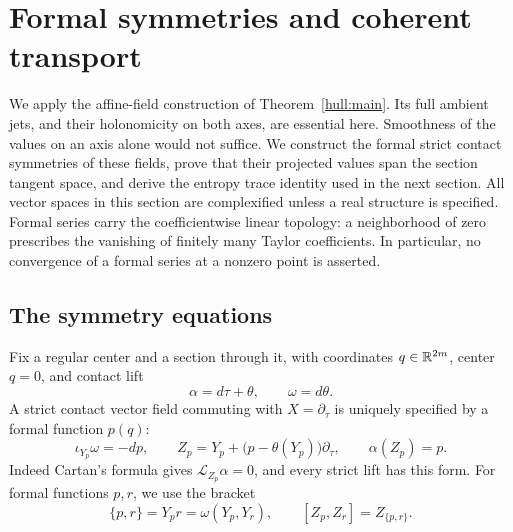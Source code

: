 \section{Formal symmetries and coherent transport}
\label{sym:section}

We apply the affine-field construction of Theorem~\ref{hull:main}.
Its full ambient jets, and their holonomicity on both axes, are essential
here.  Smoothness of the values on an axis alone would not suffice.
We construct the formal strict contact symmetries of these fields,
prove that their projected values span the section tangent space,
and derive the entropy trace identity used in the next section.
All vector spaces in this section are complexified unless a real
structure is specified.  Formal series carry the coefficientwise linear
topology: a neighborhood of zero prescribes the vanishing of finitely
many Taylor coefficients.  In particular, no convergence of a formal
series at a nonzero point is asserted.

\subsection{The symmetry equations}

Fix a regular center and a section through it, with coordinates
$q\in\mathbb R^{2m}$, center $q=0$, and contact lift
\[
 \alpha=d\tau+\theta,\qquad \omega=d\theta.
\]
A strict contact vector field commuting with $X=\partial_\tau$ is
uniquely specified by a formal function $p(q)$:
\begin{equation}
 \label{sym:hamiltonian-lift}
 \iota_{Y_p}\omega=-dp,\qquad
 Z_p=Y_p+\bigl(p-\theta(Y_p)\bigr)\partial_\tau,
 \qquad \alpha(Z_p)=p.
\end{equation}
Indeed Cartan's formula gives $\mathcal L_{Z_p}\alpha=0$, and every
strict lift has this form. For formal functions $p,r$, we use the bracket
\[
 \{p,r\}=Y_pr=\omega(Y_p,Y_r),
 \qquad [Z_p,Z_r]=Z_{\{p,r\}}.
\]


